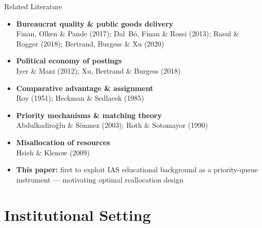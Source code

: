 \documentclass[aspectratio=169]{beamer}
\begin{document}
\begin{frame}{Related Literature}

\begin{itemize}\setlength\itemsep{10pt}
  \item \textbf{Bureaucrat quality \& public goods delivery}\\
        {\small Finan, Olken \& Pande (2017); Dal~B\'o, Finan \& Rossi (2013);
        Rasul \& Rogger (2018); Bertrand, Burgess \& Xu (2020)}

  \item \textbf{Political economy of postings}\\
        {\small Iyer \& Mani (2012); Xu, Bertrand \& Burgess (2018)}

  \item \textbf{Comparative advantage \& assignment}\\
        {\small Roy (1951); Heckman \& Sedlacek (1985)}

  \item \textbf{Priority mechanisms \& matching theory}\\
        {\small Abdulkadiro\u{g}lu \& S\"onmez (2003);
        Roth \& Sotomayor (1990)}

  \item \textbf{Misallocation of resources}\\
        {\small Hsieh \& Klenow (2009)}

  \item \textbf{This paper:} first to exploit IAS educational background
        as a priority-queue instrument --- motivating optimal reallocation design
\end{itemize}
\end{frame}

\section{Institutional Setting}
\end{document}
